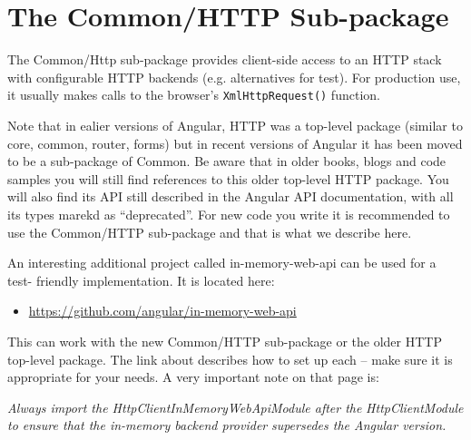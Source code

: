 \chapter{The Common/HTTP Sub-package}

The Common/Http sub-package provides client-side access to an HTTP stack with
configurable HTTP backends (e.g. alternatives for test). For production use, it usually
makes calls to the browser’s
\texttt{XmlHttpRequest()}
function.

Note that in ealier versions of Angular, HTTP was a top-level package (similar to core,
common, router, forms) but in recent versions of Angular it has been moved to be a
sub-package of Common. Be aware that in older books, blogs and code samples you
will still find references to this older top-level HTTP package. You will also find its API
still described in the Angular API documentation, with all its types marekd as
“deprecated”. For new code you write it is recommended to use the Common/HTTP
sub-package and that is what we describe here.

An interesting additional project called in-memory-web-api can be used for a test-
friendly implementation. It is located here:

\begin{itemize}
  \item \url{https://github.com/angular/in-memory-web-api}
\end{itemize}

This can work with the new Common/HTTP sub-package or the older HTTP top-level
package. The link about describes how to set up each – make sure it is appropriate for
your needs. A very important note on that page is:

\emph{Always import the HttpClientInMemoryWebApiModule after the}
\emph{HttpClientModule to ensure that the in-memory backend provider}
\emph{supersedes the Angular version.}




